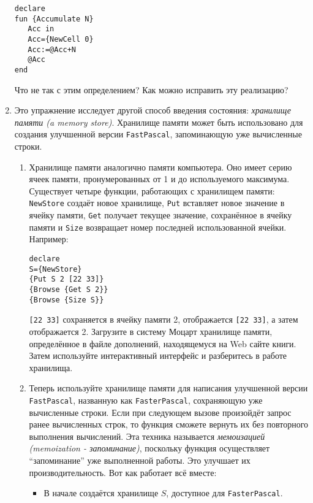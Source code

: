 \begin{enumerate}
{\begin{lstlisting}
declare
fun {Accumulate N}
   Acc in
   Acc={NewCell 0}
   Acc:=@Acc+N
   @Acc
end
\end{lstlisting}

Что не так с этим определением? Как можно исправить эту реализацию?}

\item{Это упражнение исследует другой способ введения состояния: \emph{хранилище памяти (a memory store)}. Хранилище памяти может быть использовано для создания улучшенной версии \lstinline|FastPascal|, запоминающую уже вычисленные строки.

  \begin{enumerate}

    \item{Хранилище памяти аналогично памяти компьютера. Оно имеет серию ячеек памяти, пронумерованных от 1 и до используемого максимума. Существует четыре функции, работающих с хранилищем памяти: \lstinline|NewStore| создаёт новое хранилище, \lstinline|Put| вставляет новое значение в ячейку памяти, \lstinline|Get| получает текущее значение, сохранённое в ячейку памяти и \lstinline|Size| возвращает номер последней использованной ячейки. Например:

      \begin{lstlisting}
declare
S={NewStore}
{Put S 2 [22 33]}
{Browse {Get S 2}}
{Browse {Size S}}
\end{lstlisting}

      \lstinline|[22 33]| сохраняется в ячейку памяти 2, отображается \lstinline|[22 33]|, а затем отображается 2. Загрузите в систему Моцарт хранилище памяти, определённое в файле дополнений, находящемуся на Web сайте книги. Затем используйте интерактивный интерфейс и разберитесь в работе хранилища.}

\item{Теперь используйте хранилище памяти для написания улучшенной версии \lstinline|FastPascal|, названную как \lstinline|FasterPascal|, сохраняющую уже вычисленные строки. Если при следующем вызове произойдёт запрос ранее вычисленных строк, то функция сможете вернуть их без повторного выполнения вычислений. Эта техника называется \emph{мемоизацией (memoization - запоминание)}, поскольку функция осуществляет ``запоминание'' уже выполненной работы. Это улучшает их производительность. Вот как работает всё вместе:

  \begin{itemize}
\item{В начале создаётся хранилище $S$, доступное для \lstinline|FasterPascal|.}


\end{itemize}}
\end{enumerate}}
\end{enumerate}
